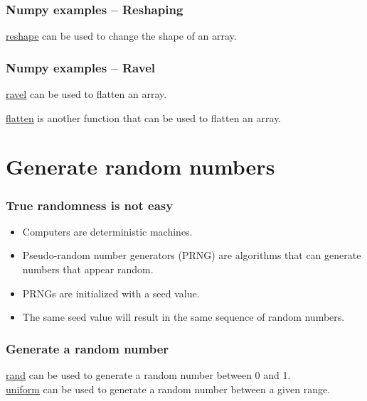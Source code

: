 \documentclass{beamer}
\newcommand{\hrefu}[2]{\underline{\href{#1}{#2}}}
\begin{document}
\begin{frame}
  \frametitle{Numpy examples -- Reshaping}
  \hrefu{https://numpy.org/doc/stable/reference/generated/numpy.reshape.html}{reshape} can be used to change the shape of an array.
  
\end{frame}
\begin{frame}
  \frametitle{Numpy examples -- Ravel}
  \hrefu{https://numpy.org/doc/stable/reference/generated/numpy.ravel.html}{ravel} can be used to flatten an array.
  
  \hrefu{https://numpy.org/doc/stable/reference/generated/numpy.ndarray.flatten.html}{flatten} is another function that can be used to flatten an array.
\end{frame}

\section{Generate random numbers}
\begin{frame}
    \frametitle{True randomness is not easy}
    \begin{itemize}
        \item Computers are deterministic machines.
        \item Pseudo-random number generators (PRNG) are algorithms that can generate numbers that appear random.
        \item PRNGs are initialized with a seed value.
        \item The same seed value will result in the same sequence of random numbers.
    \end{itemize}
\end{frame}
\begin{frame}
    \frametitle{Generate a random number}
    \hrefu{https://numpy.org/doc/stable/reference/random/generated/numpy.random.rand.html}{rand} can be used to generate a random number between 0 and 1.\\
    \hrefu{https://numpy.org/doc/stable/reference/random/generated/numpy.random.uniform.html}{uniform} can be used to generate a random number between a given range.

    
\end{frame}
\end{document}
